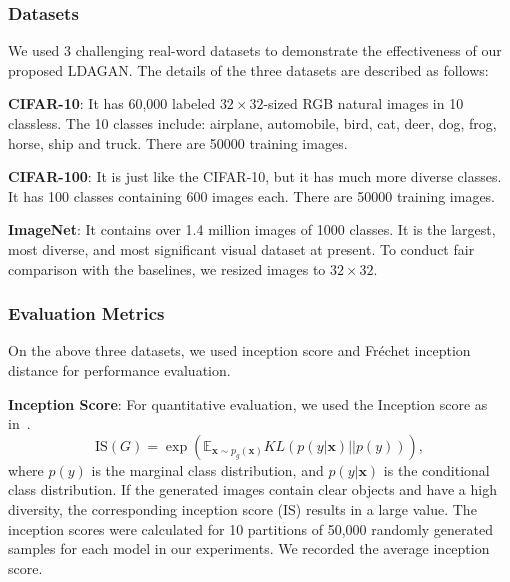 \documentclass{article}
\begin{document}
\subsubsection{Datasets}
\label{sec:Datasets}

We used 3 challenging real-word datasets to demonstrate the effectiveness of our proposed LDAGAN.
The details of the three datasets are described as follows:

\noindent\textbf{CIFAR-10}: It has 60,000 labeled $32\times32$-sized RGB natural images in 10 classless.
The 10 classes include: airplane, automobile, bird, cat, deer, dog, frog, horse, ship and truck.
There are 50000 training images.

\noindent\textbf{CIFAR-100}: It is just like the CIFAR-10, but it has much more diverse classes.
It has 100 classes containing 600 images each.
There are 50000 training images.

\noindent\textbf{ImageNet}:  It contains over 1.4 million images of 1000 classes.
It is the largest,  most diverse, and most significant visual dataset at present.
To conduct fair comparison with the baselines, we resized images to $32\times32$.


\subsubsection{Evaluation Metrics}
\label{sec:EvaMetrics}

On the above three datasets, we used inception score and Fr\'{e}chet inception distance for performance evaluation.


\noindent\textbf{Inception Score}: For quantitative evaluation, we used the Inception score as in~\cite{salimans2016improved}.
\begin{equation}
\mathrm{IS} \left(G\right)
=
\exp
\left(
\mathbb{E}_{\mathbf{x}\sim p_g\left(\mathbf{x}\right)}
KL\left(p\left(y|\mathbf{x}\right) || p\left(y\right)\right)
\right),
\end{equation}
where $p\left(y\right)$ is the marginal class distribution, and $p\left(y|\mathbf{x}\right)$ is the conditional class distribution.
If the generated images contain clear objects and have a high diversity, the corresponding inception score (IS) results in a large value.
The inception scores were calculated for 10 partitions of 50,000 randomly generated samples for each model in our experiments.
We recorded the average inception score.
\end{document}
